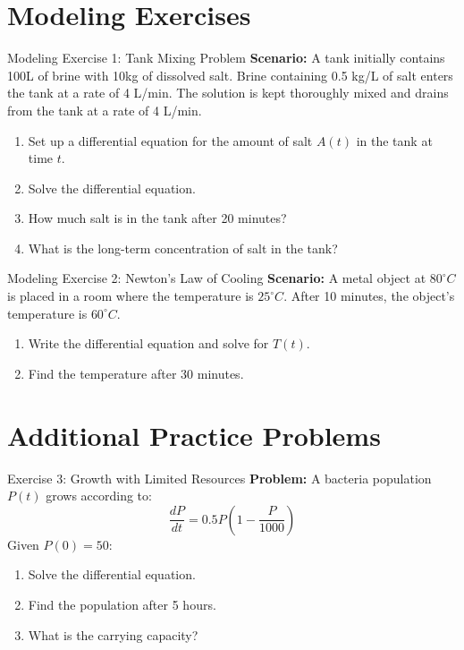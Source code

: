 \documentclass[10pt,aspectratio=169]{beamer}
\newcommand{\concept}[1]{\textbf{#1}}
\newcommand{\formula}[1]{\textit{#1}}
\begin{document}
\section{Modeling Exercises}
\begin{frame}{Modeling Exercise 1: Tank Mixing Problem}
    \concept{Scenario:} A tank initially contains 100L of brine with 10kg of dissolved salt. Brine containing 0.5 kg/L of salt enters the tank at a rate of 4 L/min. The solution is kept thoroughly mixed and drains from the tank at a rate of 4 L/min.
    \begin{enumerate}
        \item Set up a differential equation for the amount of salt $A(t)$ in the tank at time $t$.
        \item Solve the differential equation.
        \item How much salt is in the tank after 20 minutes?
        \item What is the long-term concentration of salt in the tank?
    \end{enumerate}
\end{frame}

\begin{frame}{Modeling Exercise 2: Newton's Law of Cooling}
    \concept{Scenario:} A metal object at $80^\circ C$ is placed in a room where the temperature is $25^\circ C$. After 10 minutes, the object's temperature is $60^\circ C$.
    \begin{enumerate}
        \item Write the differential equation and solve for $T(t)$.
        \item Find the temperature after 30 minutes.
    \end{enumerate}
\end{frame}

\section{Additional Practice Problems}
\begin{frame}{Exercise 3: Growth with Limited Resources}
    \concept{Problem:} A bacteria population $P(t)$ grows according to:
    \formula{\[ \frac{dP}{dt} = 0.5P\left(1-\frac{P}{1000}\right) \]}
    Given $P(0) = 50$:
    \begin{enumerate}
        \item Solve the differential equation.
        \item Find the population after 5 hours.
        \item What is the carrying capacity?
    \end{enumerate}
\end{frame}
\end{document}

